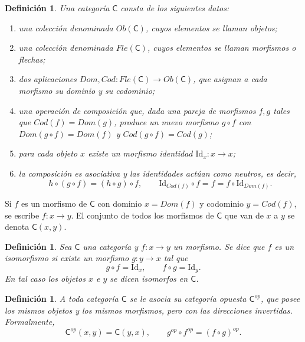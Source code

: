 \documentclass[12pt]{book}
\newtheorem{definition}[theorem]{Definición}
\newcommand{\Id}{\mathrm{Id}}
\begin{document}
\begin{definition}\label{def:categoria}
Una \emph{categoría} \( \mathsf{C} \) consta de los siguientes datos:
\begin{enumerate}[\normalfont (1)]
  \item una colección denominada \( Ob(\mathsf{C}) \), cuyos elementos se llaman \emph{objetos};
  \item una colección denominada \( Fle(\mathsf{C}) \), cuyos elementos se llaman \emph{morfismos} o \emph{flechas};
  \item dos aplicaciones \( Dom,Cod \colon Fle(\mathsf{C}) \to Ob(\mathsf{C}) \), que asignan a cada morfismo su \emph{dominio} y su \emph{codominio};
  \item una operación de composición que, dada una pareja de morfismos \( f,g \) tales que \( Cod(f)=Dom(g) \), produce un nuevo morfismo \( g\circ f \) con \( Dom(g\circ f)=Dom(f) \) y \( Cod(g\circ f)=Cod(g) \);
  \item para cada objeto \( x \) existe un morfismo identidad \( \Id_{x}\colon x\to x \);
  \item la composición es asociativa y las identidades actúan como neutros, es decir,
  \[
  h\circ(g\circ f)=(h\circ g)\circ f,
  \qquad
  \Id_{Cod(f)}\circ f=f=f\circ \Id_{Dom(f)}.
  \]
\end{enumerate}
\end{definition}

Si \( f \) es un morfismo de \( \mathsf{C} \) con dominio \( x=Dom(f) \) y codominio \( y=Cod(f) \), se escribe \( f\colon x\to y \).  
El conjunto de todos los morfismos de \( \mathsf{C} \) que van de \( x \) a \( y \) se denota \( \mathsf{C}(x,y) \).


\begin{definition}
Sea \( \mathsf{C} \) una categoría y \( f\colon x\to y \) un morfismo.  
Se dice que \( f \) es un \emph{isomorfismo} si existe un morfismo \( g\colon y\to x \) tal que
\[
g\circ f=\Id_{x},\qquad f\circ g=\Id_{y}.
\]
En tal caso los objetos \( x \) e \( y \) se dicen \emph{isomorfos} en \( \mathsf{C} \).
\end{definition}

\begin{definition}
A toda categoría \( \mathsf{C} \) se le asocia su \emph{categoría opuesta} \( \mathsf{C}^{op} \), que posee los mismos objetos y los mismos morfismos, pero con las direcciones invertidas.  
Formalmente,
\[
\mathsf{C}^{op}(x,y) = \mathsf{C}(y,x),
\qquad
g^{op}\circ f^{op} = (f\circ g)^{op}.
\]
\end{definition}
\end{document}
